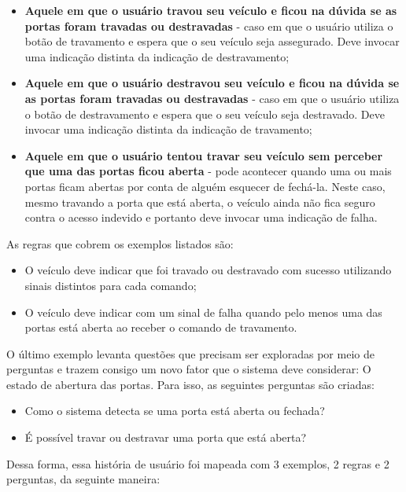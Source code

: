 \begin{itemize}
    \item \textbf{Aquele em que o usuário travou seu veículo e ficou na dúvida se as portas foram travadas ou destravadas} - caso em que o usuário utiliza o botão de travamento e espera que o seu veículo seja assegurado. Deve invocar uma indicação distinta da indicação de destravamento;
    \item \textbf{Aquele em que o usuário destravou seu veículo e ficou na dúvida se as portas foram travadas ou destravadas} - caso em que o usuário utiliza o botão de destravamento e espera que o seu veículo seja destravado. Deve invocar uma indicação distinta da indicação de travamento;
    \item \textbf{Aquele em que o usuário tentou travar seu veículo sem perceber que uma das portas ficou aberta} - pode acontecer quando uma ou mais portas ficam abertas por conta de alguém esquecer de fechá-la. Neste caso, mesmo travando a porta que está aberta, o veículo ainda não fica seguro contra o acesso indevido e portanto deve invocar uma indicação de falha.
\end{itemize} 

As regras que cobrem os exemplos listados são:

\begin{itemize}
    \item O veículo deve indicar que foi travado ou destravado com sucesso utilizando sinais distintos para cada comando;
    \item O veículo deve indicar com um sinal de falha quando pelo menos uma das portas está aberta ao receber o comando de travamento.
\end{itemize}

O último exemplo levanta questões que precisam ser exploradas por meio de perguntas e trazem consigo um novo fator que o sistema deve considerar: O estado de 
abertura das portas. Para isso, as seguintes perguntas são criadas:

\begin{itemize}
    \item Como o sistema detecta se uma porta está aberta ou fechada?
    \item É possível travar ou destravar uma porta que está aberta?
\end{itemize}

Dessa forma, essa história de usuário foi mapeada com 3 exemplos, 2 regras e 2 perguntas, da seguinte maneira:

